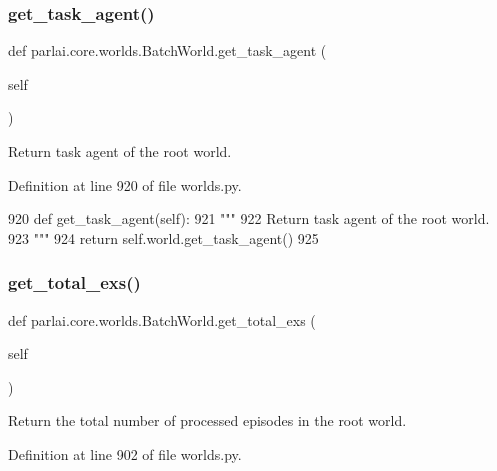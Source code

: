 \subsubsection{\texorpdfstring{get\+\_\+task\+\_\+agent()}{get\_task\_agent()}}
{\footnotesize\ttfamily def parlai.\+core.\+worlds.\+Batch\+World.\+get\+\_\+task\+\_\+agent (\begin{DoxyParamCaption}\item[{}]{self }\end{DoxyParamCaption})}

\begin{DoxyVerb}Return task agent of the root world.
\end{DoxyVerb}
 

Definition at line 920 of file worlds.\+py.


\begin{DoxyCode}
920     \textcolor{keyword}{def }get\_task\_agent(self):
921         \textcolor{stringliteral}{"""}
922 \textcolor{stringliteral}{        Return task agent of the root world.}
923 \textcolor{stringliteral}{        """}
924         \textcolor{keywordflow}{return} self.world.get\_task\_agent()
925 
\end{DoxyCode}
\mbox{\label{classparlai_1_1core_1_1worlds_1_1BatchWorld_ae9aec5868c6870316b6f1983a1e5e0ae}} 
\subsubsection{\texorpdfstring{get\+\_\+total\+\_\+exs()}{get\_total\_exs()}}
{\footnotesize\ttfamily def parlai.\+core.\+worlds.\+Batch\+World.\+get\+\_\+total\+\_\+exs (\begin{DoxyParamCaption}\item[{}]{self }\end{DoxyParamCaption})}

\begin{DoxyVerb}Return the total number of processed episodes in the root world.
\end{DoxyVerb}
 

Definition at line 902 of file worlds.\+py.


